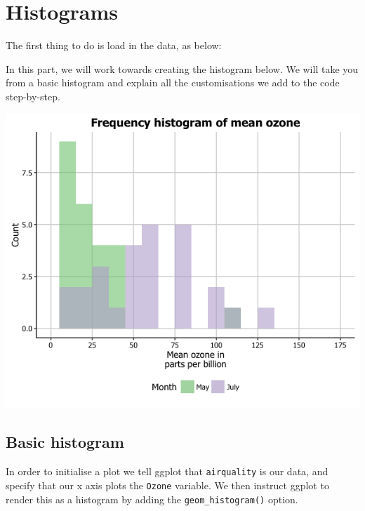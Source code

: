 \chapter{Histograms}\label{histograms}

The first thing to do is load in the data, as below:

\begin{Shaded}
\begin{Highlighting}[]
\NormalTok{(} \NormalTok{())}

\end{Highlighting}
\end{Shaded}

In this part, we will work towards creating the histogram below. We will
take you from a basic histogram and explain all the customisations we
add to the code step-by-step.

\begin{center}\includegraphics[width=0.55\linewidth]{0_all_posts_pdf/histogram_final-1} \end{center}

\section{Basic histogram}\label{basic-histogram}

In order to initialise a plot we tell ggplot that \texttt{airquality} is
our data, and specify that our x axis plots the \texttt{Ozone} variable.
We then instruct ggplot to render this as a histogram by adding the
\texttt{geom\_histogram()} option.

\begin{Shaded}
\begin{Highlighting}[]
\StringTok{ }\NormalTok{(} \StringTok{ }\NormalTok{()}
\end{Highlighting}
\end{Shaded}

